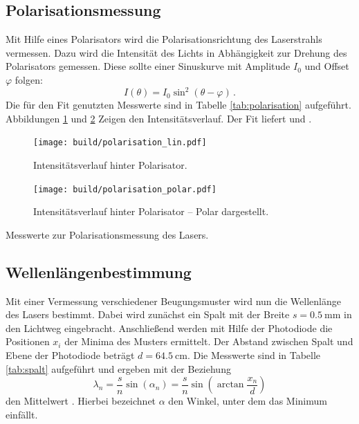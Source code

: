 \subsection{Polarisationsmessung}
\label{subsec:polarisation}
Mit Hilfe eines Polarisators wird die Polarisationsrichtung des Laserstrahls  
vermessen.
Dazu wird die Intensität des Lichts in Abhängigkeit zur Drehung des
Polarisators gemessen.
Diese sollte einer Sinuskurve mit Amplitude $I_0$ und Offset $\varphi$ folgen:
\begin{equation*}
    I(\theta) = I_0 \sin^2\!\left(\theta-\varphi\right)\,.
\end{equation*}
Die für den Fit genutzten Messwerte sind in Tabelle \ref{tab:polarisation}
aufgeführt. Abbildungen \ref{fig:polarisation} und \ref{fig:polarisation_polar}
Zeigen den Intensitätsverlauf.
Der Fit liefert  und
\unskip.
\begin{figure}
    \centering
    \texttt{[image: build/polarisation\_lin.pdf]}
    \caption{Intensitätsverlauf hinter Polarisator.}
    \label{fig:polarisation}
\end{figure}
\begin{figure}
    \centering
    \texttt{[image: build/polarisation\_polar.pdf]}
    \caption{Intensitätsverlauf hinter Polarisator -- Polar dargestellt.}
    \label{fig:polarisation_polar}
\end{figure}
\begin{table}
    \centering
    \caption{Messwerte zur Polarisationsmessung des Lasers.}
    \label{tab:polarisation}
    
\end{table}

\subsection{Wellenlängenbestimmung}
\label{subsec:wellenlänge}
Mit einer Vermessung verschiedener Beugungsmuster wird nun die Wellenlänge des
Lasers bestimmt.
Dabei wird zunächst ein Spalt mit der Breite $s = \SI{0.5}{\milli\meter}$ in den Lichtweg eingebracht.
Anschließend werden mit Hilfe der Photodiode die Positionen $x_i$ der Minima des Musters ermittelt.
Der Abstand zwischen Spalt und Ebene der Photodiode beträgt $d = \SI{64.5}{\centi\meter}$.
Die Messwerte sind in Tabelle \ref{tab:spalt} aufgeführt und ergeben mit der Beziehung
\begin{equation}
    \label{eq:spalt}
    \lambda_n = \frac{s}{n}\sin\!\left(\alpha_n\right) = \frac{s}{n}\sin\!\left(\arctan\frac{x_n}{d}\right)
\end{equation}
den Mittelwert \unskip.
Hierbei bezeichnet $\alpha$ den Winkel, unter dem das Minimum einfällt.

